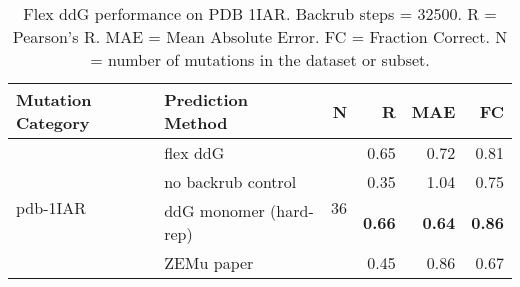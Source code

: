 \begin{table}
  \begin{tabular}{llrrrr}
\toprule
Mutation Category &       Prediction Method &   N &    R &  MAE &   FC \\
\midrule
 \multirow{ 4}{*}{pdb-1IAR} & flex ddG & \multirow{ 4}{*}{36} & 0.65 & 0.72 & 0.81  \\
 & no backrub control & & 0.35 & 1.04 & 0.75  \\
 & ddG monomer (hard-rep) & & \textbf{0.66} & \textbf{0.64} & \textbf{0.86}  \\
 & ZEMu paper & & 0.45 & 0.86 & 0.67  \\
\bottomrule
\end{tabular}
  \caption[Flex ddG performance on PDB 1IAR]{
    Flex ddG performance on PDB 1IAR. Backrub steps = 32500. R = Pearson's R. MAE = Mean Absolute Error. FC = Fraction Correct. N = number of mutations in the dataset or subset.
  } \label{tab:table-pdb-1IAR}
\end{table}
